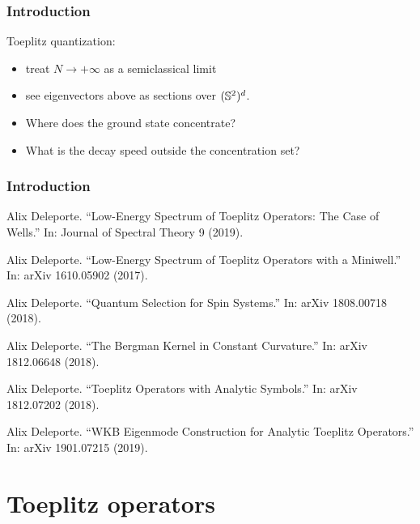 \documentclass[mathserif]{beamer}
\begin{document}
      \begin{frame}
        \frametitle{Introduction}
        Toeplitz quantization:
        \begin{itemize}
          \item treat $N\to +\infty$ as a semiclassical
       limit
     \item see eigenvectors above as sections over $(\S^2)^d$.
     \end{itemize}
     \begin{itemize}
        \item<2-> Where does the ground state concentrate?
        \item<3> What is the decay speed outside the concentration set?
        \end{itemize}
      \end{frame}

      \begin{frame}
        \frametitle{Introduction}
        {\footnotesize
        \begin{description}
        \item<1>[{[Del19]}] Alix Deleporte. “Low-Energy Spectrum of Toeplitz Operators: The Case
of Wells.” In: Journal of Spectral Theory 9 (2019).
\item<1-2> [{[Del17++]}] Alix Deleporte. “Low-Energy Spectrum of Toeplitz Operators with a
Miniwell.” In: arXiv 1610.05902 (2017).
\item<1>[{[Del18a++]}] Alix Deleporte. “Quantum Selection for Spin Systems.” In: arXiv
1808.00718 (2018).
\item<1>[{[Del18b++]}] Alix Deleporte. “The Bergman Kernel in Constant Curvature.” In:
arXiv 1812.06648 (2018).
\item<1-2>[{[Del18c++]}] Alix Deleporte. “Toeplitz Operators with Analytic Symbols.” In: arXiv
1812.07202 (2018).
\item<1>[{[Del19++]}] Alix Deleporte. “WKB Eigenmode Construction for Analytic Toeplitz
  Operators.” In: arXiv 1901.07215 (2019).
        \end{description}}
      \end{frame}

      



      \section{Toeplitz operators}
\end{document}
